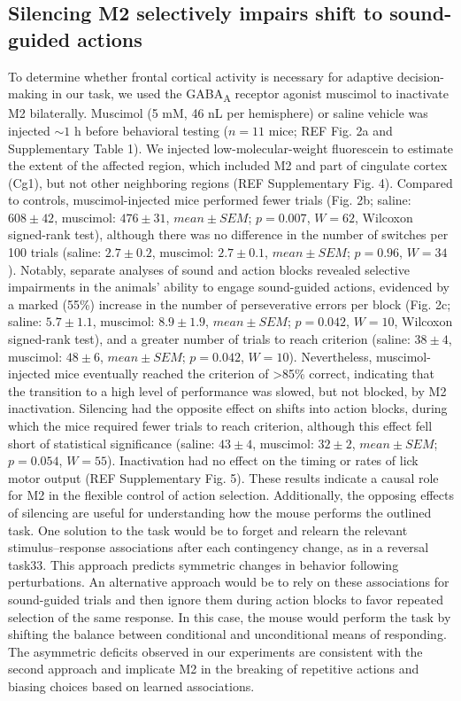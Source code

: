 \subsection{Silencing M2 selectively impairs shift to sound-guided actions}
To determine whether frontal cortical activity is necessary for adaptive decision-making in our task, we used the GABA\textsubscript{A} receptor agonist muscimol to inactivate M2 bilaterally. Muscimol (5 mM, 46 nL per hemisphere) or saline vehicle was injected $\sim 1$ h before behavioral testing ($n = 11$ mice; REF Fig. 2a and Supplementary Table 1). We injected low-molecular-weight fluorescein to estimate the extent of the affected region, which included M2 and part of cingulate cortex (Cg1), but not other neighboring regions (REF Supplementary Fig. 4). Compared to controls, muscimol-injected mice performed fewer trials (Fig. 2b; saline: $608 \pm 42$, muscimol: $476 \pm 31$, $mean \pm SEM$; $p = 0.007$, $W = 62$, Wilcoxon signed-rank test), although there was no difference in the number of switches per 100 trials (saline: $2.7 \pm 0.2$, muscimol: $2.7 \pm 0.1$, $mean \pm SEM$; $p = 0.96$, $W = 34$). Notably, separate analyses of sound and action blocks revealed selective impairments in the animals' ability to engage sound-guided actions, evidenced by a marked (55\%) increase in the number of perseverative errors per block (Fig. 2c; saline: $5.7 \pm 1.1$, muscimol: $8.9 \pm 1.9$, $mean \pm SEM$; $p = 0.042$, $W = 10$, Wilcoxon signed-rank test), and a greater number of trials to reach criterion (saline: $38 \pm 4$, muscimol: $48 \pm 6$, $mean \pm SEM$; $p = 0.042$, $W = 10$). Nevertheless, muscimol-injected mice eventually reached the criterion of >85\% correct, indicating that the transition to a high level of performance was slowed, but not blocked, by M2 inactivation. Silencing had the opposite effect on shifts into action blocks, during which the mice required fewer trials to reach criterion, although this effect fell short of statistical significance (saline: $43 \pm 4$, muscimol: $32 \pm 2$, $mean \pm SEM$; $p = 0.054$, $W = 55$). Inactivation had no effect on the timing or rates of lick motor output (REF Supplementary Fig. 5). These results indicate a causal role for M2 in the flexible control of action selection. Additionally, the opposing effects of silencing are useful for understanding how the mouse performs the outlined task. One solution to the task would be to forget and relearn the relevant stimulus–response associations after each contingency change, as in a reversal task33. This approach predicts symmetric changes in behavior following perturbations. An alternative approach would be to rely on these associations for sound-guided trials and then ignore them during action blocks to favor repeated selection of the same response. In this case, the mouse would perform the task by shifting the balance between conditional and unconditional means of responding. The asymmetric deficits observed in our experiments are consistent with the second approach and implicate M2 in the breaking of repetitive actions and biasing choices based on learned associations.

